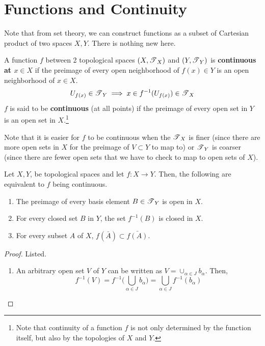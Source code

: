 \section{Functions and Continuity} 

  Note that from set theory, we can construct functions as a subset of Cartesian product of two spaces $X, Y$. There is nothing new here. 

  \begin{definition}
    A function $f$ between 2 topological spaces $(X, \T_{X})$ and $(Y, \T_{Y})$ is \textbf{continuous at $x \in X$} if the preimage of every open neighborhood of $f(x) \in Y$ is an open neighborhood of $x \in X$.
    \begin{equation}
      U_{f(x)} \in \T_{Y} \implies x \in f^{-1}(U_{f(x)}) \in \T_{X}
    \end{equation} 
    $f$ is said to be \textbf{continuous} (at all points) if the preimage of every open set in $Y$ is an open set in $X$.\footnote{Note that continuity of a function $f$ is not only determined by the function itself, but also by the topologies of $X$ and $Y$.}
  \end{definition}

  Note that it is easier for $f$ to be continuous when the $\T_X$ is finer (since there are more open sets in $X$ for the preimage of $V \subset Y$ to map to) or $\T_Y$ is coarser (since there are fewer open sets that we have to check to map to open sets of $X$). 

  \begin{theorem}
    Let $X, Y$, be topological spaces and let $f: X \longrightarrow Y$. Then, the following are equivalent to $f$ being continuous. 
    \begin{enumerate}
      \item The preimage of every basis element $B \in \T_Y$ is open in $X$. 
      \item For every closed set $B$ in $Y$, the set $f^{-1} (B)$ is closed in $X$. 
      \item For every subset $A$ of $X$, $f(\bar{A}) \subset \bar{f(A)}$. 
    \end{enumerate}
  \end{theorem}  
  \begin{proof}
    Listed. 
    \begin{enumerate}
      \item An arbitrary open set $V$ of $Y$ can be written as $V = \cup_{\alpha \in J} b_\alpha$. Then, 
      \begin{equation}
        f^{-1} (V) = f^{-1} \Big( \bigcup_{\alpha \in J} b_\alpha \Big) = \bigcup_{\alpha \in J} f^{-1} (b_\alpha)
      \end{equation}
    \end{enumerate}
  \end{proof}

